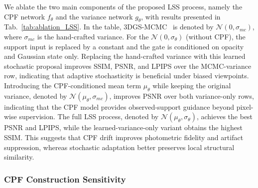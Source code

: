 \documentclass[lettersize,journal]{IEEEtran}
\begin{document}
We ablate the two main components of the proposed LSS process, namely the CPF network $f_{\theta}$ and the variance network $g_{\theta}$, with results presented in Tab.~\ref{tab:ablation_LSS}.
In the table, 3DGS-MCMC~\cite{mcmc} is denoted by $\mathcal{N}(0, \sigma_{mc})$, where $\sigma_{mc}$ is the hand-crafted variance. For the $\mathcal{N}(0,\sigma_{\theta})$ (without CPF), the support input is replaced by a constant and the gate is conditioned on opacity and Gaussian state only. Replacing the hand-crafted variance with this learned stochastic proposal improves SSIM, PSNR, and LPIPS over the MCMC-variance row, indicating that adaptive stochasticity is beneficial under biased viewpoints. Introducing the CPF-conditioned mean term $\mu_{\theta}$ while keeping the original variance, denoted by $\mathcal{N}(\mu_{\theta}, \sigma_{mc})$, improves PSNR over both variance-only rows, indicating that the CPF model provides observed-support guidance beyond pixel-wise supervision. The full LSS process, denoted by $\mathcal{N}(\mu_{\theta}, \sigma_{\theta})$, achieves the best PSNR and LPIPS, while the learned-variance-only variant obtains the highest SSIM. This suggests that CPF drift improves photometric fidelity and artifact suppression, whereas stochastic adaptation better preserves local structural similarity.


\subsubsection{CPF Construction Sensitivity}

\begin{table}[h]
\centering
\caption{Ablation studies of geometric field and CPF model, evaluated on Tanks \& Temples~\cite{tankstemples} with coverage gap of 60$^\circ$.}
\label{tab:ablation_CPF}
\end{table}
\end{document}
